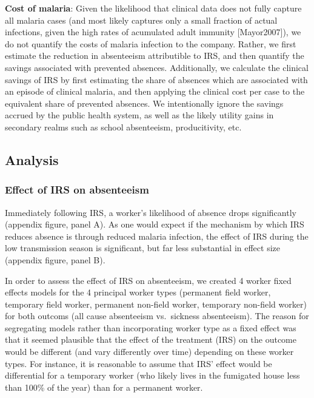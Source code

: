 \documentclass[]{article}
\begin{document}
\textbf{Cost of malaria}: Given the likelihood that clinical data does
not fully capture all malaria cases (and most likely captures only a
small fraction of actual infections, given the high rates of acumulated
adult immunity {[}Mayor2007{]}), we do not quantify the costs of malaria
infection to the company. Rather, we first estimate the reduction in
absenteeism attributible to IRS, and then quantify the savings
associated with prevented absences. Additionally, we calculate the
clinical savings of IRS by first estimating the share of absences which
are associated with an episode of clinical malaria, and then applying
the clinical cost per case to the equivalent share of prevented
absences. We intentionally ignore the savings accrued by the public
health system, as well as the likely utility gains in secondary realms
such as school absenteeism, producitivity, etc.

\subsection{Analysis}\label{analysis}

\subsubsection{Effect of IRS on
absenteeism}\label{effect-of-irs-on-absenteeism}

Immediately following IRS, a worker's likelihood of absence drops
significantly (appendix figure, panel A). As one would expect if the
mechanism by which IRS reduces absence is through reduced malaria
infection, the effect of IRS during the low transmission season is
significant, but far less substantial in effect size (appendix figure,
panel B).

In order to assess the effect of IRS on absenteeism, we created 4 worker
fixed effects models for the 4 principal worker types (permanent field
worker, temporary field worker, permanent non-field worker, temporary
non-field worker) for both outcoms (all cause absenteeism vs.~sickness
absenteeism). The reason for segregating models rather than
incorporating worker type as a fixed effect was that it seemed plausible
that the effect of the treatment (IRS) on the outcome would be different
(and vary differently over time) depending on these worker types. For
instance, it is reasonable to assume that IRS' effect would be
differential for a temporary worker (who likely lives in the fumigated
house less than 100\% of the year) than for a permanent worker.
\end{document}
